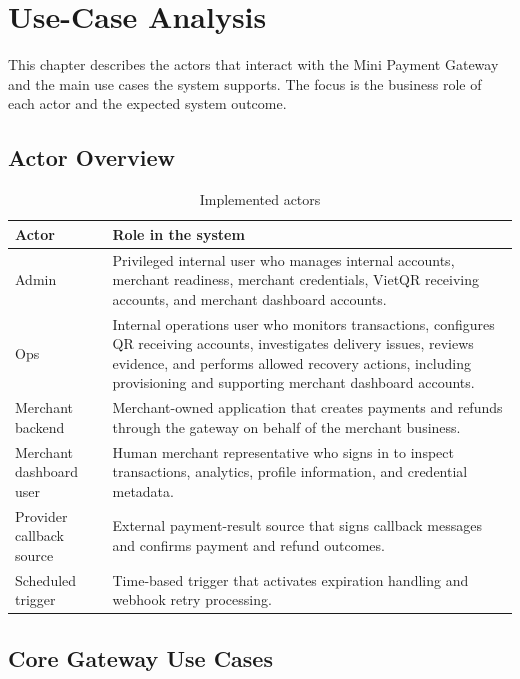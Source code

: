 \chapter{Use-Case Analysis}

This chapter describes the actors that interact with the Mini Payment Gateway
and the main use cases the system supports. The focus is the business role of
each actor and the expected system outcome.

\section{Actor Overview}

\begin{table}[!htbp]
\centering
\caption{Implemented actors}
\begin{tabularx}{\textwidth}{L{0.25\textwidth}Y}
\toprule
\textbf{Actor} & \textbf{Role in the system} \\
\midrule
Admin & Privileged internal user who manages internal accounts, merchant
readiness, merchant credentials, VietQR receiving accounts, and merchant
dashboard accounts. \\
\bodyrowrule
Ops & Internal operations user who monitors transactions, configures QR
receiving accounts, investigates delivery issues, reviews evidence, and
performs allowed recovery actions, including provisioning and supporting
merchant dashboard accounts. \\
\bodyrowrule
Merchant backend & Merchant-owned application that creates payments and refunds
through the gateway on behalf of the merchant business. \\
\bodyrowrule
Merchant dashboard user & Human merchant representative who signs in to inspect
transactions, analytics, profile information, and credential metadata. \\
\bodyrowrule
Provider callback source & External payment-result source that signs callback
messages and confirms payment and refund outcomes. \\
\bodyrowrule
Scheduled trigger & Time-based trigger that activates expiration handling and
webhook retry processing. \\
\bottomrule
\end{tabularx}
\end{table}

\section{Core Gateway Use Cases}

